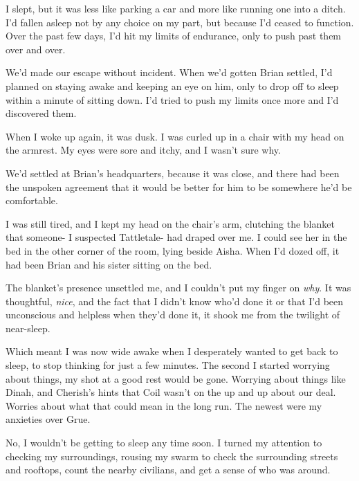 





I slept, but it was less like parking a car and more like running one into a ditch.  I'd fallen asleep not by any choice on my part, but because I'd ceased to function.  Over the past few days, I'd hit my limits of endurance, only to push past them over and over.



We'd made our escape without incident.  When we'd gotten Brian settled, I'd planned on staying awake and keeping an eye on him, only to drop off to sleep within a minute of sitting down.  I'd tried to push my limits once more and I'd discovered them.



When I woke up again, it was dusk.  I was curled up in a chair with my head on the armrest.  My eyes were sore and itchy, and I wasn't sure why.



We'd settled at Brian's headquarters, because it was close, and there had been the unspoken agreement that it would be better for him to be somewhere he'd be comfortable.



I was still tired, and I kept my head on the chair's arm, clutching the blanket that someone- I suspected Tattletale- had draped over me.  I could see her in the bed in the other corner of the room, lying beside Aisha.  When I'd dozed off, it had been Brian and his sister sitting on the bed.



The blanket's presence unsettled me, and I couldn't put my finger on \emph{why}.  It was thoughtful, \emph{nice}, and the fact that I didn't know who'd done it or that I'd been unconscious and helpless when they'd done it, it shook me from the twilight of near-sleep.



Which meant I was now wide awake when I desperately wanted to get back to sleep, to stop thinking for just a few minutes.  The second I started worrying about things, my shot at a good rest would be gone.  Worrying about things like Dinah, and Cherish's hints that Coil wasn't on the up and up about our deal.  Worries about what that could mean in the long run.  The newest were my anxieties over Grue.



No, I wouldn't be getting to sleep any time soon.  I turned my attention to checking my surroundings, rousing my swarm to check the surrounding streets and rooftops, count the nearby civilians, and get a sense of who was around.



